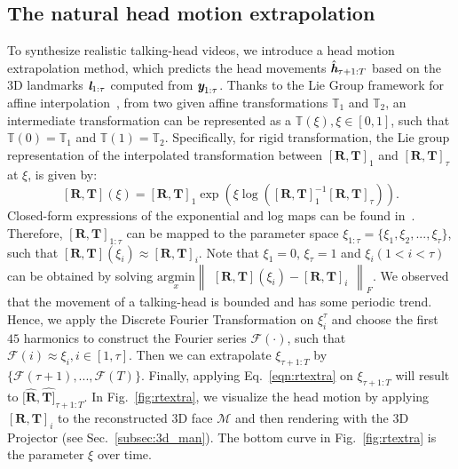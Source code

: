 \documentclass[runningheads]{llncs}
\def\mathbi#1{\textbf{\em #1}}
\begin{document}
\subsection{The natural head motion extrapolation}
\label{subsec:movement}

To synthesize realistic talking-head videos, we introduce a head motion extrapolation method, which predicts the head movements $\hat{\mathbi{h}}_{\tau +1:T}$ based on the 3D landmarks $\mathbi{l}_{1:\tau}$ computed from ${\mathbi{y}}_{1:\tau}$. Thanks to the Lie Group framework for affine interpolation~\cite{bansal2019affine}, from two given affine transformations $\mathbb{T}_1$ and $\mathbb{T}_2$, an intermediate transformation can be represented as a $\mathbb{T}(\xi), \xi\in[0,1]$, such that $\mathbb{T}(0)=\mathbb{T}_1$ and $\mathbb{T}(1)=\mathbb{T}_2$. Specifically, for rigid transformation, the Lie group representation of the interpolated transformation between $[\mathbf{R},\mathbf{T}]_1$ and $[\mathbf{R},\mathbf{T}]_\tau$ at $\xi$, is given by:
\begin{equation}
\label{eqn:rtextra}
[\mathbf{R},\mathbf{T}](\xi) = [\mathbf{R},\mathbf{T}]_1 \exp\left(\xi \log\left([\mathbf{R},\mathbf{T}]_1^{-1}[\mathbf{R},\mathbf{T}]_\tau\right)\right).
\end{equation}
Closed-form expressions of the exponential and log maps can be found in~\cite{bansal2019affine}.
Therefore, $[\mathbf{R},\mathbf{T}]_{1:\tau}$ can be mapped to the parameter space $\xi_{1:\tau}=\{\xi_1,\xi_2,...,\xi_\tau\}$, such that $[\mathbf{R},\mathbf{T}](\xi_i)\approx [\mathbf{R},\mathbf{T}]_i$. Note that $\xi_1=0$, $\xi_\tau=1$ and $\xi_i (1<i<\tau)$ can be obtained by solving 
$\underset{x}{\text{argmin}} \begin{Vmatrix}[\mathbf{R},\mathbf{T}](\xi_i) - [\mathbf{R},\mathbf{T}]_i\end{Vmatrix}_F$.
We observed that the movement of a talking-head is bounded and has some periodic trend. Hence, we apply the Discrete Fourier Transformation on $\xi_i^\tau$ and choose the first $45$ harmonics to construct the Fourier series $\mathcal{F}(\cdot)$, such that $\mathcal{F}(i)\approx \xi_i, i\in[1,\tau]$. Then we can extrapolate $\xi_{\tau+1:T}$ by $\{\mathcal{F}(\tau+1),...,\mathcal{F}(T)\}$. Finally, applying  Eq.~\ref{eqn:rtextra} on $\xi_{\tau+1:T}$ will result to $[\hat{\mathbf{R}},\hat{\mathbf{T}]}_{\tau + 1:T}$.
In Fig.~\ref{fig:rtextra}, we visualize the head motion by applying $[\mathbf{R},\mathbf{T}]_i$ to the reconstructed 3D face $\mathcal{M}$ and then rendering with the 3D Projector (see Sec.~\ref{subsec:3d_man}). The bottom curve in Fig.~\ref{fig:rtextra} is the parameter $\xi$ over time.
\end{document}
